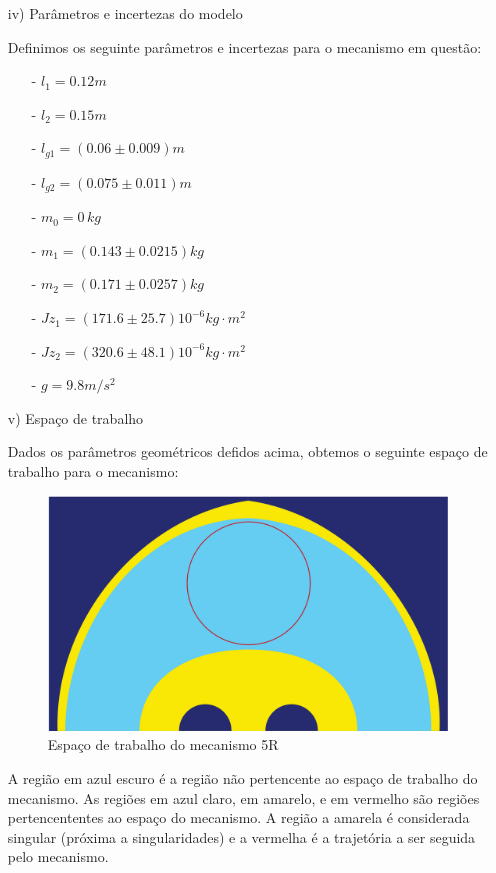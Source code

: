 \documentclass[]{politex}
\begin{document}
\begin{itemize}
\item[iv)] Parâmetros e incertezas do modelo

Definimos os seguinte parâmetros e incertezas para o mecanismo em questão:

\begin{multicols}{2}
\begin{itemize}
\item[-] $l_1 = 0.12 m$
\item[-] $l_2 = 0.15 m$
\item[-] $l_{g1} = (0.06 \pm 0.009) m$
\item[-] $l_{g2} = (0.075 \pm 0.011) m$
\item[-] $m_0 = 0 \, kg$
\item[-] $m_1 = (0.143 \pm 0.0215) kg$
\item[-] $m_2 = (0.171 \pm 0.0257) kg$
\item[-] $Jz_1 = (171.6 \pm 25.7 ) 10^{-6} kg\cdot m^2$
\item[-] $Jz_2 = (320.6 \pm 48.1 ) 10^{-6} kg\cdot m^2$
\item[-] $g = 9.8 m/s^2$
\end{itemize}
\end{multicols}

\item[v)] Espaço de trabalho

Dados os parâmetros geométricos defidos acima, obtemos o seguinte espaço de trabalho para o mecanismo:

\begin{figure}[h]
	\centering
	\includegraphics[scale=0.25]{../figures/Workspace.pdf}  
	\caption{Espaço de trabalho do mecanismo 5R}
	\label{fig:RRWS}
\end{figure}

A região em azul escuro é a região não pertencente ao espaço de trabalho do mecanismo. As regiões em azul claro, em amarelo, e em vermelho são regiões pertencententes ao espaço do mecanismo. A região a amarela é considerada singular (próxima a singularidades) e a vermelha é a trajetória a ser seguida pelo mecanismo.


\end{itemize}
\end{document}
